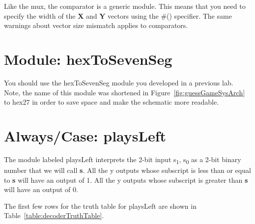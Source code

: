 Like the mux, the comparator is a generic module. This means that you
need to specify the width of the \textbf{X} and \textbf{Y} vectors
using the \#() specifier. The same warnings about vector size mismatch
applies to comparators.

\section{Module: hexToSevenSeg}
You should use the hexToSevenSeg module you developed in a
previous lab. Note, the name of this module was shortened in Figure~\ref{fig:guessGameSysArch}
to hex27 in order to save space and make the schematic more
readable.

\section{Always/Case:  playsLeft}

The module labeled playsLeft interprets the 2-bit input
s\textsubscript{1}, s\textsubscript{0} as a 2-bit binary number that we
will call \textbf{s}. All the y outputs whose subscript is less than or
equal to \textbf{s} will have an output of 1. All the y outputs whose
subscript is greater than \textbf{s} will have an output of 0.

The first few rows for the truth table for playsLeft are shown in
Table~\ref{table:decoderTruthTable}.

